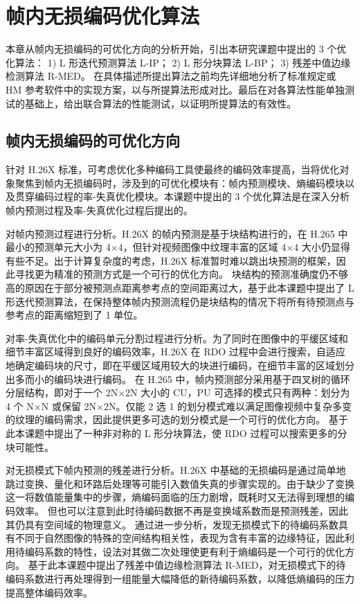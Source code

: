 \chapter{帧内无损编码优化算法}
\label{cha:c3}
本章从帧内无损编码的可优化方向的分析开始，引出本研究课题中提出的 3 个优化算法：
1) L 形迭代预测算法 L-IP；
2) L 形分块算法 L-BP；
3) 残差中值边缘检测算法 R-MED。
在具体描述所提出算法之前均先详细地分析了标准规定或 HM 参考软件中的实现方案，以与所提算法形成对比。最后在对各算法性能单独测试的基础上，给出联合算法的性能测试，以证明所提算法的有效性。

\section{帧内无损编码的可优化方向}
针对 H.26X 标准，可考虑优化多种编码工具使最终的编码效率提高，当将优化对象聚焦到帧内无损编码时，涉及到的可优化模块有：帧内预测模块、熵编码模块以及贯穿编码过程的率-失真优化模块。本课题中提出的 3 个优化算法是在深入分析帧内预测过程及率-失真优化过程后提出的。

对帧内预测过程进行分析。H.26X 的帧内预测是基于块结构进行的，在 H.265 中最小的预测单元大小为 4$\times$4，但针对视频图像中纹理丰富的区域 4$\times$4 大小仍显得有些不足。出于计算复杂度的考虑，H.26X 标准暂时难以跳出块预测的框架，因此寻找更为精准的预测方式是一个可行的优化方向。
块结构的预测准确度仍不够高的原因在于部分被预测点距离参考点的空间距离过大，基于此本课题中提出了 L 形迭代预测算法，在保持整体帧内预测流程仍是块结构的情况下将所有待预测点与参考点的距离缩短到了 1 单位。

对率-失真优化中的编码单元分割过程进行分析。为了同时在图像中的平缓区域和细节丰富区域得到良好的编码效率，H.26X 在 RDO 过程中会进行搜索，自适应地确定编码块的尺寸，即在平缓区域用较大的块进行编码，在细节丰富的区域划分出多而小的编码块进行编码。
在 H.265 中，帧内预测部分采用基于四叉树的循环分层结构，即对于一个 2N$\times$2N 大小的 CU，PU 可选择的模式只有两种：划分为 4 个 N$\times$N 或保留 2N$\times$2N。仅能 2 选 1 的划分模式难以满足图像视频中复杂多变的纹理的编码需求，因此提供更多可选的划分模式是一个可行的优化方向。
基于此本课题中提出了一种非对称的 L 形分块算法，使 RDO 过程可以搜索更多的分块可能性。

对无损模式下帧内预测的残差进行分析。H.26X 中基础的无损编码是通过简单地跳过变换、量化和环路后处理等可能引入数值失真的步骤实现的。由于缺少了变换这一将数值能量集中的步骤，熵编码面临的压力剧增，既耗时又无法得到理想的编码效率。
但也可以注意到此时待编码数据不再是变换域系数而是预测残差，因此其仍具有空间域的物理意义。
通过进一步分析，发现无损模式下的待编码系数具有不同于自然图像的特殊的空间结构相关性，表现为含有丰富的边缘特征，因此利用待编码系数的特性，设法对其做二次处理使更有利于熵编码是一个可行的优化方向。
基于此本课题中提出了残差中值边缘检测算法 R-MED，对无损模式下的待编码系数进行再处理得到一组能量大幅降低的新待编码系数，以降低熵编码的压力提高整体编码效率。

